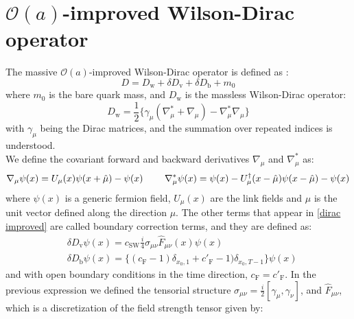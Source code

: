 \chapter{$\mathcal{O}(a)$-improved Wilson-Dirac operator}
\label{app: Wilson improved op}

The massive $\mathcal{O}(a)$-improved Wilson-Dirac operator is defined as \cite{L_scher_2013, L_scher_1996, SHEIKHOLESLAMI1985572}:
\begin{equation}\label{dirac improved}
    D = D_{\textrm{w}} + \delta D_{\textrm{v}} + \delta D_{\textrm{b}} + m_0
\end{equation}
where $m_0$ is the bare quark mass, and $D_{\textrm{w}}$ is the massless Wilson-Dirac operator:
\begin{equation}
    D_{\textrm{w}} = \frac{1}{2}\{\gamma_\mu \left(\nabla^*_\mu + \nabla_\mu \right) - \nabla^*_\mu \nabla_\mu\}
\end{equation}
with $\gamma_\mu$ being the Dirac matrices, and the summation over repeated indices is understood.
\\ We define the covariant forward and backward derivatives $\nabla_\mu$ and $\nabla^*_\mu$ as:
\begin{equation}
    \nabla_\mu \psi(x) = U_\mu(x) \psi(x + \hat{\mu}) - \psi(x) \hspace{8mm} \nabla^*_\mu \psi(x) = \psi(x) -  U^\dagger_\mu(x - \hat{\mu}) \psi(x - \hat{\mu}) - \psi(x)
\end{equation}
where $\psi(x)$ is a generic fermion field, $U_\mu(x)$ are the link fields and $\hat{\mu}$ is the unit vector defined along the direction $\mu$.
The other terms that appear in \eqref{dirac improved} are called boundary correction terms, and they are defined as:
\begin{equation}
    \begin{split}
       & \delta D_{\textrm{v}} \psi(x) = c_{\textrm{SW}} \frac{i}{4} \sigma_{\mu\nu} \hat{F}_{\mu\nu}(x) \psi(x) \\
        & \delta D_{\textrm{b}} \psi(x) = \{ (c_{\textrm{F}} - 1)\delta_{x_0, 1} + c'_{\textrm{F}} - 1)\delta_{x_0, T-1} \} \psi(x)
    \end{split}
\end{equation}
and with open boundary conditions in the time direction, $c_{\textrm{F}} = c'_{\textrm{F}}$. In the previous expression we defined the tensorial structure $\sigma_{\mu\nu} = \frac{i}{2}\left[\gamma_\mu, \gamma_\nu \right]$, and $\hat{F}_{\mu\nu}$, which is a discretization of the field strength tensor given by:
